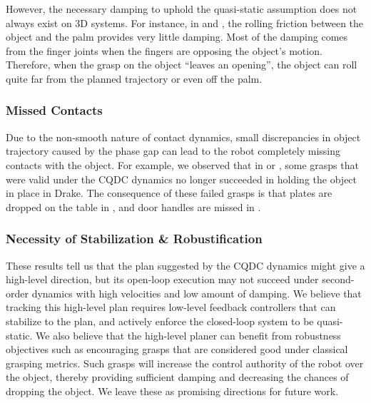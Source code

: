 However, the necessary damping to uphold the quasi-static assumption does not always exist on 3D systems. For instance, in  and , the rolling friction between the object and the palm provides very little damping. Most of the damping comes from the finger joints when the fingers are opposing the object's motion. Therefore, when the grasp on the object ``leaves an opening'', the object can roll quite far from the planned trajectory or even off the palm. 

\subsubsection{Missed Contacts}
Due to the non-smooth nature of contact dynamics, small discrepancies in object trajectory caused by the phase gap can lead to the robot completely missing contacts with the object. For example, we observed that in  or , some grasps that were valid under the CQDC dynamics no longer succeeded in holding the object in place in Drake. The consequence of these failed grasps is that plates are dropped on the table in , and door handles are missed in .


\subsubsection{Necessity of Stabilization \& Robustification}
These results tell us that the plan suggested by the CQDC dynamics might give a high-level direction, but its open-loop execution may not succeed under second-order dynamics with high velocities and low amount of damping. We believe that tracking this high-level plan requires low-level feedback controllers that can stabilize to the plan, and actively enforce the closed-loop system to be quasi-static. We also believe that the high-level planer can benefit from robustness objectives such as encouraging grasps that are considered good under classical grasping metrics. Such grasps will increase the control authority of the robot over the object, thereby providing sufficient damping and decreasing the chances of dropping the object. We leave these as promising directions for future work. 